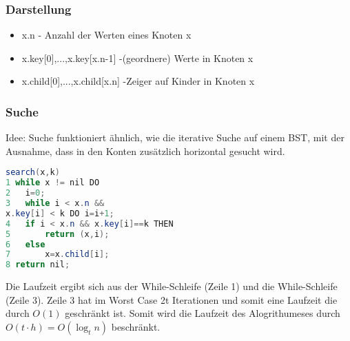 \documentclass[jou,apacite]{apa6}
\begin{document}
\subsubsection{Darstellung}
\begin{itemize}
    \item x.n - Anzahl der Werten eines Knoten x
    \item x.key[0],...,x.key[x.n-1] -(geordnere) Werte in Knoten x
    \item x.child[0],...,x.child[x.n] -Zeiger auf Kinder in Knoten x
\end{itemize}
\subsubsection{Suche}
Idee: Suche funktioniert ähnlich, wie die iterative Suche auf einem BST, mit der Ausnahme, dass in den Konten zusätzlich horizontal gesucht wird.
\begin{lstlisting}[language=java]
search(x,k)
1 while x != nil DO
2   i=0;
3   while i < x.n &&
x.key[i] < k DO i=i+1;
4   if i < x.n && x.key[i]==k THEN
5       return (x,i);
6   else
7       x=x.child[i];
8 return nil;
\end{lstlisting}
Die Laufzeit ergibt sich aus der While-Schleife (Zeile 1) und die While-Schleife (Zeile 3). Zeile 3 hat im Worst Case 2t Iterationen und somit eine Laufzeit die durch $O(1)$ geschränkt ist. Somit wird die Laufzeit des Alogrithumeses durch $O(t\cdot h) = O(\log_t n)$ beschränkt.
\end{document}

